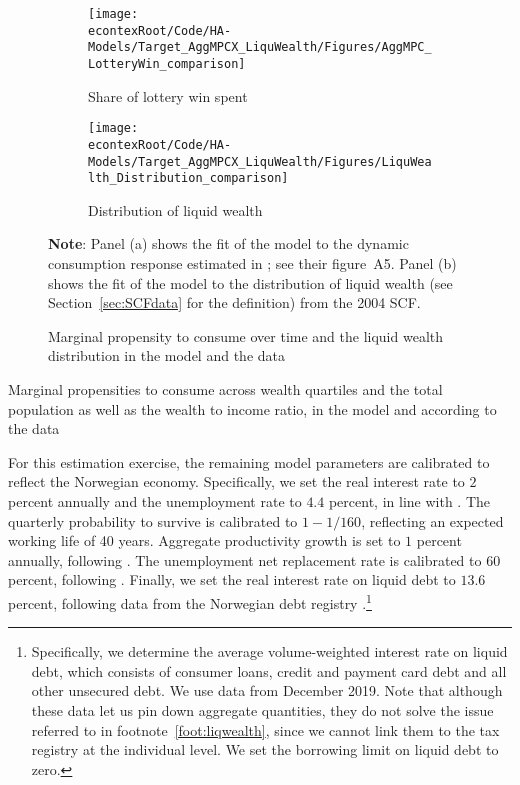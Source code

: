 \documentclass[\econtexRoot/HAFiscal]{subfiles}
\begin{document}
\begin{figure}[htb]
  \centering
  \begin{subfigure}[b]{.48\linewidth}
    \centering
    \texttt{[image: \\econtexRoot/Code/HA-Models/Target\_AggMPCX\_LiquWealth/Figures/AggMPC\_LotteryWin\_comparison]}
    \caption{Share of lottery win spent}
    \notinsubfile{\label{fig:aggmpclotterywin}}
  \end{subfigure}
  \begin{subfigure}[b]{.48\linewidth}
    \centering
    \texttt{[image: \\econtexRoot/Code/HA-Models/Target\_AggMPCX\_LiquWealth/Figures/LiquWealth\_Distribution\_comparison]}
    \caption{Distribution of liquid wealth}
    \notinsubfile{\label{fig:liquwealthdistribution}}
  \end{subfigure}%
  \caption{Marginal propensity to consume over time and the liquid wealth distribution in the model and the data}
  \notinsubfile{\label{fig:splurge_estimation}}
  \parbox{16cm}{\small \vspace{.15cm} \textbf{Note}: Panel (a) shows the fit of the model to the dynamic consumption response estimated in {\citet{fagereng_mpc_2021}}; see their figure~A5.
Panel (b) shows the fit of the model to the distribution of liquid wealth (see Section~\ref{sec:SCFdata} for the definition) from the 2004 SCF.\normalsize}
\end{figure}


\begin{table}[t]
  \center
  
  \caption{Marginal propensities to consume across wealth quartiles and the total population as well as the wealth to income ratio, in the model and according to the data}
  \notinsubfile{\label{tab:MPC_WQ}}
\end{table}


For this estimation exercise, the remaining model parameters are calibrated to reflect the Norwegian economy.
Specifically, we set the real interest rate to $2$ percent annually and the unemployment rate to $4.4$ percent, in line with \citet{aursland_state-dependent_2020}.
The quarterly probability to survive is calibrated to $1-1/160$, reflecting an expected working life of 40 years.
Aggregate productivity growth is set to $1$ percent annually, following \citet{kravik_navigating_2019}.
The unemployment net replacement rate is calibrated to $60$ percent, following \citet{oecd_net_2020}.
Finally, we set the real interest rate on liquid debt to $13.6$ percent, following data from the Norwegian debt registry \citet{gjeldsregistret_nokkeltall_2022}.\footnote{Specifically, we determine the average volume-weighted interest rate on liquid debt, which consists of consumer loans, credit and payment card debt and all other unsecured debt.
We use data from December 2019.
Note that although these data let us pin down aggregate quantities, they do not solve the issue referred to in footnote~\ref{foot:liqwealth}, since we cannot link them to the tax registry at the individual level.
We set the borrowing limit on liquid debt to zero.}
\end{document}
